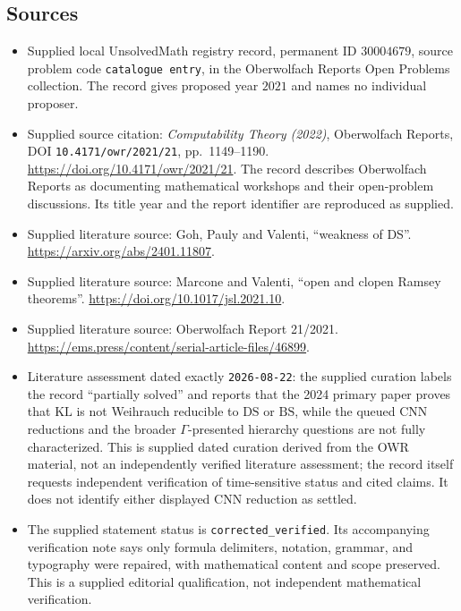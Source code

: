 \documentclass[11pt]{article}
\begin{document}
\subsection{Sources}
\begin{itemize}
\item Supplied local UnsolvedMath registry record, permanent ID \(30004679\), source problem code \texttt{catalogue entry}, in the Oberwolfach Reports Open Problems collection. The record gives proposed year \(2021\) and names no individual proposer.
\item Supplied source citation: \emph{Computability Theory (2022)}, Oberwolfach Reports, DOI \texttt{10.4171/owr/2021/21}, pp.\ 1149--1190. \url{https://doi.org/10.4171/owr/2021/21}. The record describes Oberwolfach Reports as documenting mathematical workshops and their open-problem discussions. Its title year and the report identifier are reproduced as supplied.
\item Supplied literature source: Goh, Pauly and Valenti, ``weakness of DS''. \url{https://arxiv.org/abs/2401.11807}.
\item Supplied literature source: Marcone and Valenti, ``open and clopen Ramsey theorems''. \url{https://doi.org/10.1017/jsl.2021.10}.
\item Supplied literature source: Oberwolfach Report 21/2021. \url{https://ems.press/content/serial-article-files/46899}.
\item Literature assessment dated exactly \texttt{2026-08-22}: the supplied curation labels the record ``partially solved'' and reports that the 2024 primary paper proves that \(\mathrm{KL}\) is not Weihrauch reducible to \(\mathrm{DS}\) or \(\mathrm{BS}\), while the queued \(\mathrm{CNN}\) reductions and the broader \(\Gamma\)-presented hierarchy questions are not fully characterized. This is supplied dated curation derived from the OWR material, not an independently verified literature assessment; the record itself requests independent verification of time-sensitive status and cited claims. It does not identify either displayed \(\mathrm{CNN}\) reduction as settled.
\item The supplied statement status is \texttt{corrected\_verified}. Its accompanying verification note says only formula delimiters, notation, grammar, and typography were repaired, with mathematical content and scope preserved. This is a supplied editorial qualification, not independent mathematical verification.
\end{itemize}
\end{document}
